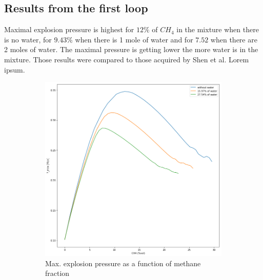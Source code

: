 \documentclass[a4paper]{article}
\begin{document}
\subsection{Results from the first loop}
Maximal explosion pressure is highest for $12\%$ of $CH_4$ in the mixture when there is no water, for $9.43\%$ when there is 1 mole of water and for $7.52$ when there are 2 moles of water. The maximal pressure is getting lower the more water is in the mixture.
Those results were compared to those acquired by Shen et al.\cite{shen2016explosion}
Lorem ipsum.
\begin{figure}[H]
    \centering
    \begin{subfigure}[b]{0.4\textwidth}
        \includegraphics[width=\textwidth]{1_Pmax_to_CH4.png}
        	\caption{Max. explosion pressure as a function of methane fraction}
        \label{fig:1_1}
    \end{subfigure}
    \qquad
    \begin{subfigure}[b]{0.4\textwidth}

\end{subfigure}
\end{figure}
\end{document}
